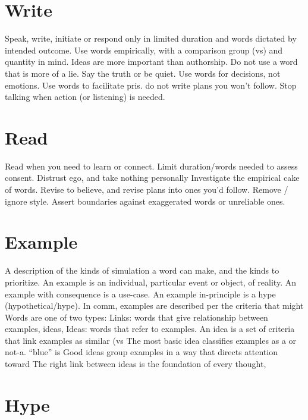 \documentclass[
]{book}
\begin{document}
\hypertarget{word-write}{%
\section{Write}\label{word-write}}

Speak, write, initiate or respond only in limited duration and words dictated by intended outcome.
Use words empirically, with a comparison group (vs) and quantity in mind.
Ideas are more important than authorship.
Do not use a word that is more of a lie.
Say the truth or be quiet.
Use words for decisions, not emotions.
Use words to facilitate pris. do not write plans you won't follow.
Stop talking when action (or listening) is needed.

\hypertarget{word-read}{%
\section{Read}\label{word-read}}

Read when you need to learn or connect.
Limit duration/words needed to assess consent.
Distrust ego, and take nothing personally
Investigate the empirical cake of words.
Revise to believe, and revise plans into ones you'd follow.
Remove / ignore style.
Assert boundaries against exaggerated words or unreliable ones.

\hypertarget{word-example}{%
\section{Example}\label{word-example}}

A description of the kinds of simulation a word can make, and the kinds to prioritize.
An example is an individual, particular event or object, of reality.
An example with consequence is a use-case.
An example in-principle is a hype (hypothetical/hype).
In comm, examples are described per the criteria that might
Words are one of two types:
Links: words that give relationship between examples, ideas,
Ideas: words that refer to examples.
An idea is a set of criteria that link examples as similar (vs
The most basic idea classifies examples as a or not-a. ``blue'' is
Good ideas group examples in a way that directs attention toward
The right link between ideas is the foundation of every thought,

\hypertarget{hype}{%
\section{Hype}\label{hype}}
\end{document}
